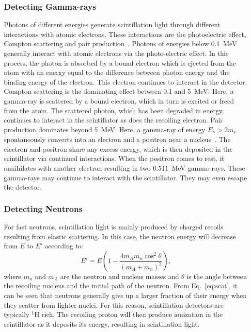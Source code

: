 \documentclass[main.tex]{subfiles}
\begin{document}
\subsubsection{Detecting Gamma-rays}
Photons of different energies generate scintillation light through different interactions with atomic electrons. These interactions are the photoelectric effect, Compton scattering and pair production~\cite{Krane}. 
Photons of energies below \SI{0.1}{\MeV} generally interact with atomic electrons via the photo-electric effect. In this process, the photon is absorbed by a bound electron which is ejected from the atom with an energy equal to the difference between photon energy and the binding energy of the electron. This electron continues to interact in the detector.
Compton scattering is the dominating effect between 0.1 and \SI{5}{\MeV}. Here, a gamma-ray is scattered by a bound electron, which in turn is excited or freed from the atom. The scattered photon, which has been degraded in energy, continues to interact in the scintillator as does the recoiling electron.
Pair production dominates beyond \SI{5}{\MeV}. Here, a gamma-ray of energy $E_\gamma>2m_e$ spontaneously converts into an electron and a positron near a nucleus~\cite{Krane}. The electron and positron share any excess energy, which is then deposited in the scintillator via continued interactions. When the positron comes to rest, it annihilates with another electron resulting in two \SI{0.511}{\MeV} gamma-rays. These gamma-rays may continue to interact with the scintillator. They may even escape the detector.


\subsubsection{Detecting Neutrons}
For fast neutrons, scintillation light is mainly produced by charged recoils resulting from elastic scattering. In this case, the neutron energy will decrease from $E$ to $E'$ according to:
\begin{equation}
	E' = E\left(1 - \frac{4m_A m_n \cos^2{\theta}}{\left(m_A + m_n\right)^2}\right),
	\label{eq:scat}
\end{equation}
where $m_n$ and $m_A$ are the neutron and nucleus masses and $\theta$ is the angle between the recoiling nucleus and the initial path of the neutron. From Eq.~\ref{eq:scat}, it can be seen that neutrons generally give up a larger fraction of their energy when they scatter from lighter nuclei. 
For this reason, scintillation detectors are typically $^1$H rich. The recoiling proton will then produce ionization in the scintillator as it deposits its energy, resulting in scintillation light. 
\end{document}
